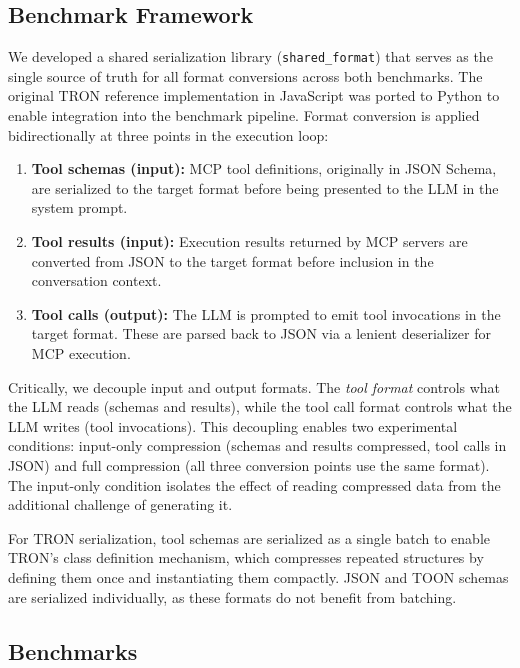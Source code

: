 \documentclass[10pt,twocolumn,letterpaper]{article}
\begin{document}
\subsection{Benchmark Framework}
\label{sec:framework}

We developed a shared serialization library (\texttt{shared\_format}) that serves as the single source of truth for all format conversions across both benchmarks. The original TRON reference implementation in JavaScript \citep{tron-format/tron-javascript_2026} was ported to Python to enable integration into the benchmark pipeline. Format conversion is applied bidirectionally at three points in the execution loop:

\begin{enumerate}
    \item \textbf{Tool schemas (input):} MCP tool definitions, originally in JSON Schema, are serialized to the target format before being presented to the LLM in the system prompt.
    \item \textbf{Tool results (input):} Execution results returned by MCP servers are converted from JSON to the target format before inclusion in the conversation context.
    \item \textbf{Tool calls (output):} The LLM is prompted to emit tool invocations in the target format. These are parsed back to JSON via a lenient deserializer for MCP execution.
\end{enumerate}

Critically, we decouple input and output formats. The \textit{tool format} controls what the LLM reads (schemas and results), while the tool call format controls what the LLM writes (tool invocations). This decoupling enables two experimental conditions: input-only compression (schemas and results compressed, tool calls in JSON) and full compression (all three conversion points use the same format). The input-only condition isolates the effect of reading compressed data from the additional challenge of generating it.

For TRON serialization, tool schemas are serialized as a single batch to enable TRON's class definition mechanism, which compresses repeated structures by defining them once and instantiating them compactly. JSON and TOON schemas are serialized individually, as these formats do not benefit from batching.

\subsection{Benchmarks}
\label{sec:benchmarks}
\end{document}
